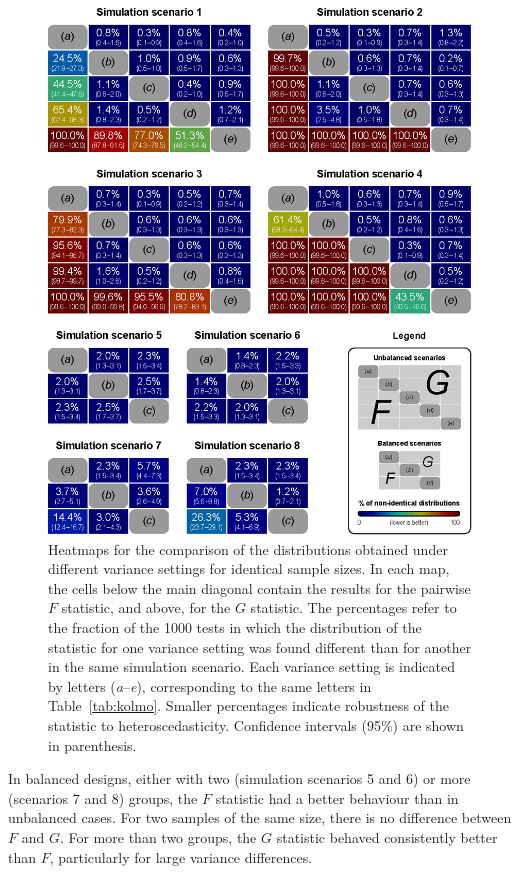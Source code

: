 \begin{figure}[!p]
\centering
\includegraphics[width=12.6cm]{images/kolmo.eps}
\caption[Heatmaps for evaluation of pivotality for $F$ and $G$ statistics.]{Heatmaps for the comparison of the distributions obtained under different variance settings for identical sample sizes. In each map, the cells below the main diagonal contain the results for the pairwise $F$ statistic, and above, for the $G$ statistic. The percentages refer to the fraction of the 1000 tests in which the distribution of the statistic for one variance setting was found different than for another in the same simulation scenario. Each variance setting is indicated by letters (\emph{a}--\emph{e}), corresponding to the same letters in Table~\ref{tab:kolmo}. Smaller percentages indicate robustness of the statistic to heteroscedasticity. Confidence intervals (95\%) are shown in parenthesis.}
\label{fig:kolmo}
\end{figure}

In balanced designs, either with two (simulation scenarios 5 and 6) or more (scenarios 7 and 8) groups, the $F$ statistic had a better behaviour than in unbalanced cases. For two samples of the same size, there is no difference between $F$ and $G$. For more than two groups, the $G$ statistic behaved consistently better than $F$, particularly for large variance differences.

